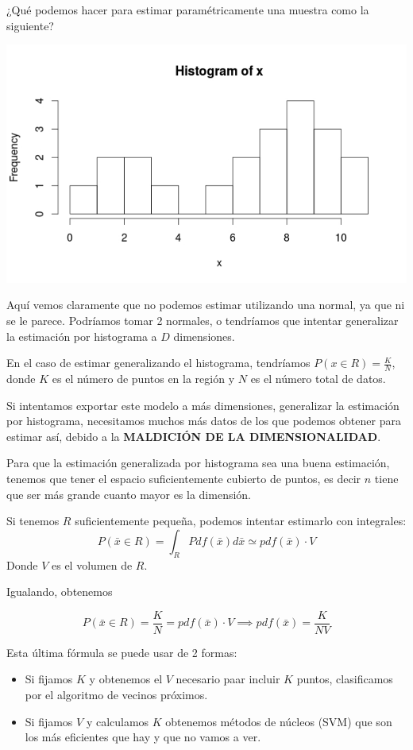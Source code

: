 \documentclass{apuntes}
\begin{document}
 ¿Qué podemos hacer para estimar paramétricamente una muestra como la siguiente?

\begin{center}
 \includegraphics[scale=0.4]{img/histogramaCenas.jpeg}
\end{center}
Aquí vemos claramente que no podemos estimar utilizando una normal, ya que ni se le parece. Podríamos tomar 2 normales, o tendríamos que intentar generalizar la estimación por histograma a $D$ dimensiones.


En el caso de estimar generalizando el histograma, tendríamos $P(x∈R) = \frac{K}{N}$, donde $K$ es el número de puntos en la región y $N$ es el número total de datos.


Si intentamos exportar este modelo a más dimensiones, generalizar la estimación por histograma, necesitamos muchos más datos de los que podemos obtener para estimar así, debido a la \textbf{MALDICIÓN DE LA DIMENSIONALIDAD}.

Para que la estimación generalizada por histograma sea una buena estimación, tenemos que tener el espacio suficientemente cubierto de puntos, es decir $n$ tiene que ser más grande cuanto mayor es la dimensión.

Si tenemos $R$ suficientemente pequeña, podemos intentar estimarlo con integrales: \[P(\bar{x}∈R) = \int_R Pdf(\bar{x})d\bar{x} \simeq pdf(\bar{x})·V\]
Donde $V$ es el volumen de $R$.

Igualando, obtenemos

\[
P(\bar{x}∈R) = \frac{K}{N} = pdf(\bar{x})·V \implies pdf(\bar{x}) = \frac{K}{NV}
\]

Esta última fórmula se puede usar de 2 formas:

\begin{itemize}
	\item Si fijamos $K$ y obtenemos el $V$ necesario paar incluir $K$ puntos, clasificamos por el algoritmo de vecinos próximos.
	\item Si fijamos $V$ y calculamos $K$ obtenemos métodos de núcleos (SVM) que son los más eficientes que hay y que no vamos a ver.
\end{itemize}
\end{document}
